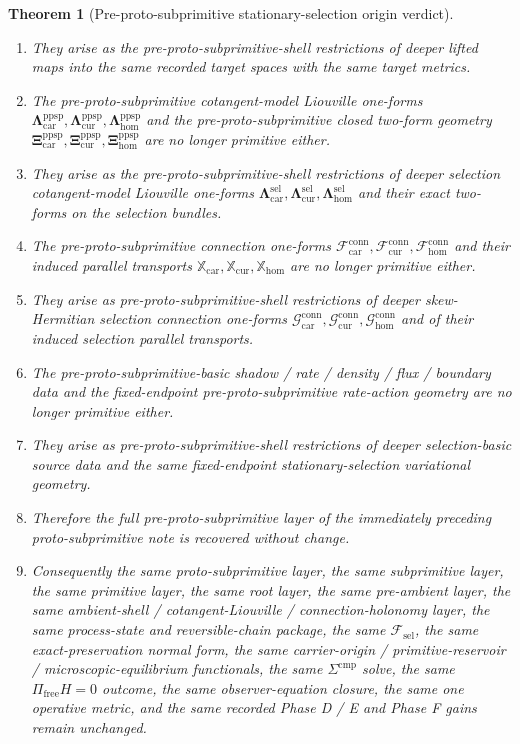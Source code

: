 \documentclass[11pt]{article}
\newcommand{\StemFunctional}{\mathscr F_{\mathrm{sel}}}
\newcommand{\Car}{\mathrm{car}}
\newcommand{\Cur}{\mathrm{cur}}
\newcommand{\Hom}{\mathrm{hom}}
\newcommand{\PreProtoSubprimLiouville}[1]{\boldsymbol{\Lambda}_{#1}^{\mathrm{ppsp}}}
\newcommand{\PreProtoSubprimTwo}[1]{\boldsymbol{\Xi}_{#1}^{\mathrm{ppsp}}}
\newcommand{\PreProtoSubprimConnectionForm}[1]{\mathcal F_{#1}^{\mathrm{conn}}}
\newcommand{\PreProtoSubprimTransport}[1]{\mathbb X_{#1}}
\newcommand{\SelLiouville}[1]{\boldsymbol{\Lambda}_{#1}^{\mathrm{sel}}}
\newcommand{\SelConnectionForm}[1]{\mathcal G_{#1}^{\mathrm{conn}}}
\newtheorem{theorem}{Theorem}
\begin{document}
\begin{theorem}[Pre-proto-subprimitive stationary-selection origin verdict]
\begin{enumerate}
    \item They arise as the pre-proto-subprimitive-shell restrictions of deeper lifted maps into the same recorded target spaces with the same target metrics.
    \item The pre-proto-subprimitive cotangent-model Liouville one-forms \(\PreProtoSubprimLiouville{\Car},\PreProtoSubprimLiouville{\Cur},\PreProtoSubprimLiouville{\Hom}\) and the pre-proto-subprimitive closed two-form geometry \(\PreProtoSubprimTwo{\Car},\PreProtoSubprimTwo{\Cur},\PreProtoSubprimTwo{\Hom}\) are no longer primitive either.
    \item They arise as the pre-proto-subprimitive-shell restrictions of deeper selection cotangent-model Liouville one-forms \(\SelLiouville{\Car},\SelLiouville{\Cur},\SelLiouville{\Hom}\) and their exact two-forms on the selection bundles.
    \item The pre-proto-subprimitive connection one-forms \(\PreProtoSubprimConnectionForm{\Car},\PreProtoSubprimConnectionForm{\Cur},\PreProtoSubprimConnectionForm{\Hom}\) and their induced parallel transports \(\PreProtoSubprimTransport{\Car},\PreProtoSubprimTransport{\Cur},\PreProtoSubprimTransport{\Hom}\) are no longer primitive either.
    \item They arise as pre-proto-subprimitive-shell restrictions of deeper skew-Hermitian selection connection one-forms \(\SelConnectionForm{\Car},\SelConnectionForm{\Cur},\SelConnectionForm{\Hom}\) and of their induced selection parallel transports.
    \item The pre-proto-subprimitive-basic shadow / rate / density / flux / boundary data and the fixed-endpoint pre-proto-subprimitive rate-action geometry are no longer primitive either.
    \item They arise as pre-proto-subprimitive-shell restrictions of deeper selection-basic source data and the same fixed-endpoint stationary-selection variational geometry.
    \item Therefore the full pre-proto-subprimitive layer of the immediately preceding proto-subprimitive note is recovered without change.
    \item Consequently the same proto-subprimitive layer, the same subprimitive layer, the same primitive layer, the same root layer, the same pre-ambient layer, the same ambient-shell / cotangent-Liouville / connection-holonomy layer, the same process-state and reversible-chain package, the same \(\StemFunctional\), the same exact-preservation normal form, the same carrier-origin / primitive-reservoir / microscopic-equilibrium functionals, the same \(\Sigma^{\mathrm{cmp}}\) solve, the same \(\Pi_{\mathrm{free}}H=0\) outcome, the same observer-equation closure, the same one operative metric, and the same recorded Phase D / E and Phase F gains remain unchanged.

\end{enumerate}
\end{theorem}
\end{document}
